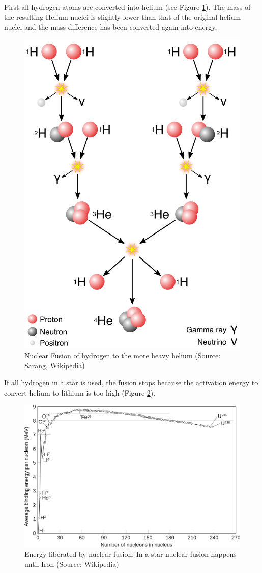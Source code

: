 \documentclass[
  11pt,
]{book}
\begin{document}
First all hydrogen atoms are converted into helium (see Figure \ref{fig:nuclearFusion}). The mass of the resulting Helium nuclei is slightly lower than that of the original helium nuclei and the mass difference has been converted again into energy.

\begin{figure}

{\centering \includegraphics[width=0.5\linewidth]{./figs/fusion} 

}

\caption{Nuclear Fusion of hydrogen to the more heavy helium (Source: Sarang, Wikipedia)}\label{fig:nuclearFusion}
\end{figure}

If all hydrogen in a star is used, the fusion stops because the activation energy to convert helium to lithium is too high (Figure \ref{fig:fusionEnergy}).

\begin{figure}

{\centering \includegraphics[width=0.5\linewidth]{./figs/fusionEnergy} 

}

\caption{Energy liberated by nuclear fusion. In a star nuclear fusion happens until Iron (Source: Wikipedia)}\label{fig:fusionEnergy}
\end{figure}
\end{document}
